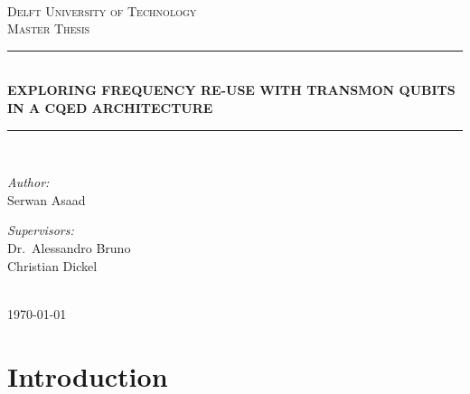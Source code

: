 \documentclass[12pt]{report}
\newcommand{\HRule}[1]{\rule{\linewidth}{#1}}
\begin{document}
\begin{titlepage}
\begin{center}
~\\ [4.0 cm]
\textsc{\LARGE Delft University of Technology}
\\ [3.0 cm]
\textsc{\Large Master Thesis}
\HRule{0.5 pt} \\
\LARGE \textbf{\uppercase{Exploring frequency re-use with transmon qubits in a cQED architecture}}
\HRule{2 pt} \\ [0.5 cm]

\noindent
\begin{minipage}{0.4\textwidth}
\begin{flushleft} \large
\emph{Author:}\\
Serwan Asaad
\end{flushleft}
\end{minipage}%
\begin{minipage}{0.4\textwidth}
\begin{flushright} \large
\emph{Supervisors:} \\
Dr.~Alessandro Bruno \\
Christian Dickel
\end{flushright}
\end{minipage}
\\ [3.0 cm]
{\large \today}
\end{center}

\end{titlepage}


\author{
    Serwan Asaad
    Student ID: 4323475 \\
    Delft University of Technology \\
    Kavli Institute of Nanoscience\\
    Quantum Nanoscience Department\\
    Quantum Transport Group\\
    DiCarlo Lab}

\tableofcontents
\newpage

\sectionfont{\scshape}


\chapter{Introduction}
\end{document}
